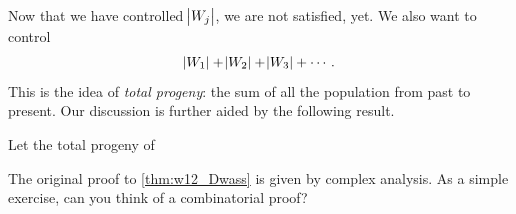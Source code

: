 Now that we have controlled $\abs{W_j}$, we are not satisfied, yet. We also want to control
\begin{equation*}
    \abs{W_1} + \abs{W_2} + \abs{W_3} + \cdots.
\end{equation*}
This is the idea of \textit{total progeny}: the sum of all the population from past to present. Our discussion is further aided by the following result.
\begin{theorem}[Dwass] \label{thm:w12_Dwass}
    Let the total progeny of 
\end{theorem}

\begin{remark}
    The original proof to \autoref{thm:w12_Dwass} is given by complex analysis. As a simple exercise, can you think of a combinatorial proof?
\end{remark}